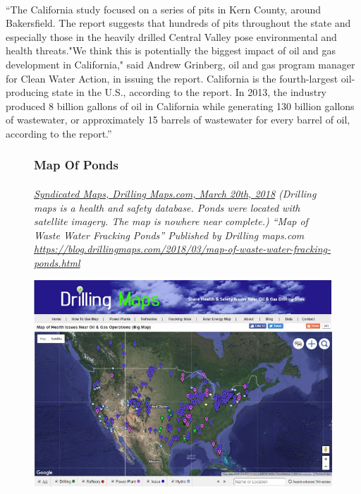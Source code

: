 \documentclass{article}
\begin{document}
\paragraph{}
``The California study focused on a series of pits in Kern County, around Bakersfield. The report suggests that hundreds of pits throughout the state and especially those in the heavily drilled Central Valley pose environmental and health threats."We think this is potentially the biggest impact of oil and gas development in California," said Andrew Grinberg, oil and gas program manager for Clean Water Action, in issuing the report. California is the fourth-largest oil-producing state in the U.S., according to the report.  In 2013, the industry produced 8 billion gallons of oil in California while generating 130 billion gallons of wastewater, or approximately 15 barrels of wastewater for every barrel of oil, according to the report.''


\begin{figure}[h!] 
  \subsubsection{Map Of Ponds}
  \paragraph{}
  \small
  \textit{
  \underline{Syndicated Maps, Drilling Maps.com, March 20th, 2018}
  (Drilling maps is a health and safety database. Ponds were located with satellite imagery. The map is nowhere near complete.) “Map of Waste Water Fracking Ponds” Published by Drilling maps.com  
  \url{https://blog.drillingmaps.com/2018/03/map-of-waste-water-fracking-ponds.html}}
  \normalsize


  \includegraphics[width=\linewidth]{openholdingmap.jpg}
\end{figure}
\end{document}
